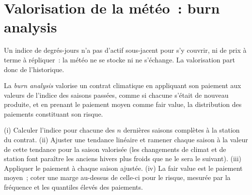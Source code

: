 \begin{omfigure}

\label{fig:m3:freight-weather-and-other-corners:hdd}
\end{omfigure}

\section{Valorisation de la météo~: burn analysis}

Un indice de degrés-jours n'a pas d'actif sous-jacent pour s'y couvrir, ni de prix à terme à répliquer~: la
météo ne se stocke ni ne s'échange. La valorisation part donc de l'historique.

\begin{definition}\label{def:m3:freight-weather-and-other-corners:burn}
La \emph{burn analysis} valorise un contrat climatique en appliquant son paiement aux valeurs
de l'indice des saisons passées, comme si chacune s'était de nouveau produite, et en prenant le paiement moyen comme fair value,
la distribution des paiements constituant son risque.
\end{definition}

\begin{method}\label{met:m3:freight-weather-and-other-corners:burn}
(i) Calculer l'indice pour chacune des $n$ dernières saisons complètes à la station du contrat.
(ii) Ajuster une tendance linéaire et ramener chaque saison à la valeur de cette tendance pour la saison valorisée (les
changements de climat et de station font paraître les anciens hivers plus froids que ne le sera le suivant). (iii) Appliquer le paiement à chaque
saison ajustée. (iv) La fair value est le paiement moyen~; coter une marge au-dessus de celle-ci pour le risque, mesurée
par la fréquence et les quantiles élevés des paiements.
\end{method}

